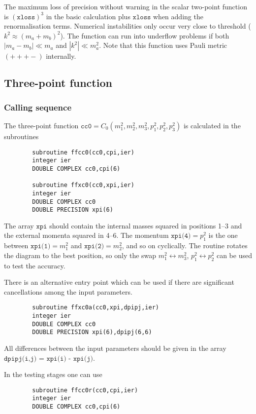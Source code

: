 \documentclass[twoside,12pt]{report}
\def\Code#1{\ensuremath{\texttt{#1}}}
\begin{document}
\begin{appendix}
The maximum loss of precision without warning in the scalar two-point function 
is $(\Code{xloss})^3$ in the basic calculation plus \Code{xloss} when adding 
the renormalisation terms.  Numerical instabilities only occur very close to 
threshold ($k^2 \approx (m_a + m_b)^2$).  The function can run into underflow 
problems if both $|m_a-m_b| \ll m_a$ and $|k^2| \ll m_a^2$.  Note that this 
function uses Pauli metric {\small $(+++-)$} internally.

\subsection{Three-point function}

\subsubsection{Calling sequence}

The three-point function $\Code{cc0} = C_0(m_1^2,m_2^2,m_3^2,p_1^2, 
p_2^2,p_3^2)$ is calculated in the subroutines
\begin{verbatim}
        subroutine ffcc0(cc0,cpi,ier)
        integer ier
        DOUBLE COMPLEX cc0,cpi(6)

        subroutine ffxc0(cc0,xpi,ier)
        integer ier
        DOUBLE COMPLEX cc0
        DOUBLE PRECISION xpi(6)
\end{verbatim}
The array \Code{xpi} should contain the internal masses squared in positions 
1--3 and the external momenta squared in 4--6.  The momentum $\Code{xpi(4)} = 
p_1^2$ is the one between $\Code{xpi(1)} = m_1^2$ and $\Code{xpi(2)} = 
m_2^2$, and so on cyclically.  The routine rotates the diagram to the best 
position, so only the swap $m_1^2 \leftrightarrow m_3^2$, $p_1^2 
\leftrightarrow p_2^2$ can be used to test the accuracy.  

There is an alternative entry point which can be used if there 
are significant cancellations among the input parameters.
\begin{verbatim}
        subroutine ffxc0a(cc0,xpi,dpipj,ier)
        integer ier
        DOUBLE COMPLEX cc0
        DOUBLE PRECISION xpi(6),dpipj(6,6)
\end{verbatim}
All differences between the input parameters should be given in the array
\Code{dpipj(i,j) = xpi(i) - xpi(j)}.

In the testing stages one can use
\begin{verbatim}
        subroutine ffcc0r(cc0,cpi,ier)
        integer ier
        DOUBLE COMPLEX cc0,cpi(6)


\end{verbatim}
\end{appendix}
\end{document}
